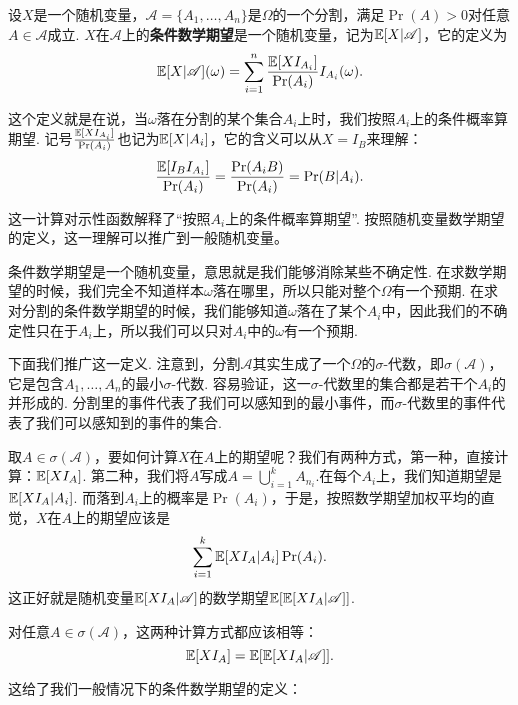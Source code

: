 \begin{definition}[基于分割的条件数学期望]\label{def:conditional-expectation}
设$X$是一个随机变量，$\mathscr{A}=\{A_1,\dots,A_n\}$是$\Omega$的一个分割，满足$\Pr(A)>0$对任意$A\in\mathscr{A}$成立. $X$在$\mathscr{A}$上的\textbf{条件数学期望}是一个随机变量，记为$\mathbb{E}[X|\mathscr{A}]$，它的定义为
\[\mathbb{E}[X|\mathscr{A}](\omega)=\sum_{i=1}^n \frac{\mathbb{E}[XI_{A_i}]}{\Pr(A_i)}I_{A_i}(\omega).\]
\end{definition}
这个定义就是在说，当$\omega$落在分割的某个集合$A_i$上时，我们按照$A_i$上的条件概率算期望. 记号$\frac{\mathbb{E}[XI_{A_i}]}{\Pr(A_i)}$也记为$\mathbb{E}[X|A_i]$，它的含义可以从$X=I_B$来理解：
\[\frac{\mathbb{E}[I_{B}I_{A_i}]}{\Pr(A_i)}=\frac{\Pr(A_iB)}{\Pr(A_i)}=\Pr(B|A_i).\]

这一计算对示性函数解释了“按照$A_i$上的条件概率算期望”. 按照随机变量数学期望的定义，这一理解可以推广到一般随机变量。 

条件数学期望是一个随机变量，意思就是我们能够消除某些不确定性. 在求数学期望的时候，我们完全不知道样本$\omega$落在哪里，所以只能对整个$\Omega$有一个预期. 在求对分割的条件数学期望的时候，我们能够知道$\omega$落在了某个$A_i$中，因此我们的不确定性只在于$A_i$上，所以我们可以只对$A_i$中的$\omega$有一个预期. 

下面我们推广这一定义. 注意到，分割$\mathscr{A}$其实生成了一个$\Omega$的$\sigma$-代数，即$\sigma(\mathscr{A})$，它是包含$A_1,\dots,A_n$的最小$\sigma$-代数. 容易验证，这一$\sigma$-代数里的集合都是若干个$A_i$的并形成的. 分割里的事件代表了我们可以感知到的最小事件，而$\sigma$-代数里的事件代表了我们可以感知到的事件的集合. 

取$A\in\sigma(\mathscr{A})$，要如何计算$X$在$A$上的期望呢？我们有两种方式，第一种，直接计算：$\mathbb{E}[XI_A]$. 第二种，我们将$A$写成$A=\bigcup_{i=1}^k A_{n_i}$.在每个$A_i$上，我们知道期望是$\mathbb{E}[XI_A|A_i]$. 而落到$A_i$上的概率是$\Pr(A_i)$，于是，按照数学期望加权平均的直觉，$X$在$A$上的期望应该是
\[\sum_{i=1}^k \mathbb{E}[XI_A|A_i]\Pr(A_i).\]
这正好就是随机变量$\mathbb{E}[XI_A|\mathscr{A}]$的数学期望$\mathbb{E}[\mathbb{E}[XI_A|\mathscr{A}]]$.

对任意$A\in\sigma(\mathscr{A})$，这两种计算方式都应该相等：
\begin{equation}
    \mathbb{E}[XI_A]=\mathbb{E}[\mathbb{E}[XI_A|\mathscr{A}]].\label{eq:conditional-expectation}
\end{equation}

这给了我们一般情况下的条件数学期望的定义：

\newcommand{\G}{\mathscr{G}}

